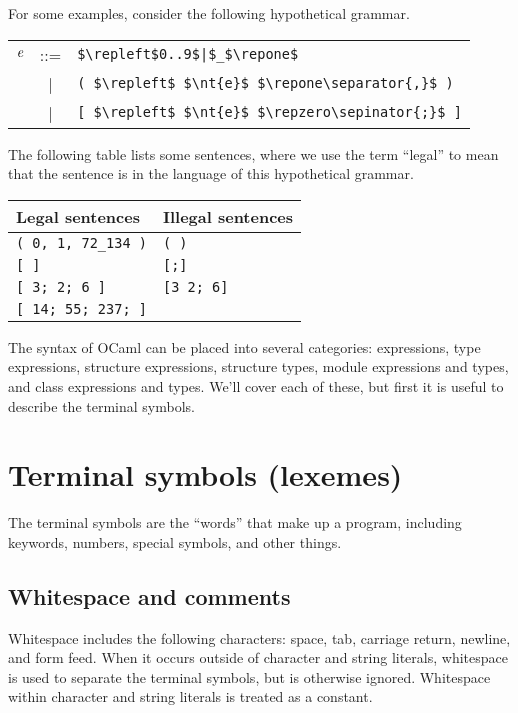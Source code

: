 For some examples, consider the following hypothetical grammar.

\begin{center}
\begin{tabular}{rcl}
$\textit{\rmfamily e}$ & ::= & \hbox{\lstinline/$\repleft$0..9$|$_$\repone$/}\\
& | & \hbox{\lstinline/( $\repleft$ $\nt{e}$ $\repone\separator{,}$ )/}\\
& | & \hbox{\lstinline/[ $\repleft$ $\nt{e}$ $\repzero\sepinator{;}$ ]/}
\end{tabular}
\end{center}
%
The following table lists some sentences, where we use the term ``legal'' to mean that the
sentence is in the language of this hypothetical grammar.

\begin{center}
\begin{tabular}{l|l}
Legal sentences & Illegal sentences\\
\hline
\hbox{\lstinline/( 0, 1, 72_134 )/} & \hbox{\lstinline/( )/}\\
\hbox{\lstinline/[ ]/}             & \hbox{\lstinline/[;]/}\\
\hbox{\lstinline/[ 3; 2; 6 ]/}     & \hbox{\lstinline/[3 2; 6]/}\\
\hbox{\lstinline/[ 14; 55; 237; ]/}
\end{tabular}
\end{center}
%
The syntax of OCaml can be placed into several categories: expressions, type expressions, structure
expressions, structure types, module expressions and types, and class expressions and types.
We'll cover each of these, but first it is useful to describe the terminal symbols.

\section{Terminal symbols (lexemes)}

The terminal symbols are the ``words'' that make up a program, including keywords, numbers, special
symbols, and other things.

\subsection{Whitespace and comments}

Whitespace includes the following characters: space, tab, carriage return, newline, and form feed.
When it occurs outside of character and string literals, whitespace is used to separate the terminal
symbols, but is otherwise ignored.  Whitespace within character and string literals is treated as a
constant.

